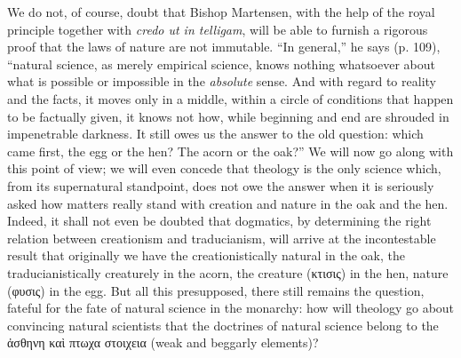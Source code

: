 \documentclass[12pt]{book}
\newcommand{\opage}[1]{\marginnote{\footnotesize\textit{[#1]}}}
\begin{document}
We do not, of course, doubt that Bishop Martensen, with the help of the royal principle together with \textit{credo ut in\-%
\opage{19}\setcounter{footnote}{0}%
telligam}, will be able to furnish a rigorous proof that the laws of nature are not immutable. ``In general,'' he says (p. 109), ``natural science, as merely empirical science, knows nothing whatsoever about what is possible or impossible in the \emph{absolute} sense. And with regard to reality and the facts, it moves only in a middle, within a circle of conditions that happen to be factually given, it knows not how, while beginning and end are shrouded in impenetrable darkness. It still owes us the answer to the old question: which came first, the egg or the hen? The acorn or the oak?'' We will now go along with this point of view; we will even concede that theology is the only science which, from its supernatural standpoint, does not owe the answer when it is seriously asked how matters really stand with creation and nature in the oak and the hen. Indeed, it shall not even be doubted that dogmatics, by determining the right relation between creationism and traducianism, will arrive at the incontestable result that originally we have the creationistically natural in the oak, the traducianistically creaturely in the acorn, the creature (κτισις) in the hen, nature (φυσις) in the egg. But all this presupposed, there still remains the question, fateful for the fate of natural science in the monarchy: how will theology go about convincing natural scientists that the doctrines of natural science belong to the ἀσθηνη καὶ πτωχα στοιχεια (weak and beggarly elements)?
\end{document}
